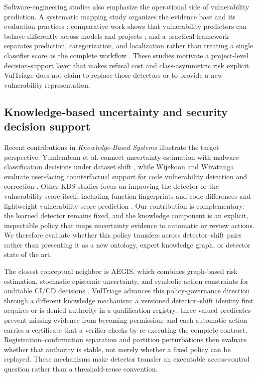 \documentclass[preprint,12pt]{elsarticle}
\newcommand{\method}{VulTriage\xspace}
\begin{document}
Software-engineering studies also emphasize the operational side of vulnerability prediction. A systematic mapping study organizes the evidence base and its evaluation practices \cite{kalouptsoglou2023mapping}; comparative work shows that vulnerability predictors can behave differently across models and projects \cite{theisen2020better}; and a practical framework separates prediction, categorization, and localization rather than treating a single classifier score as the complete workflow \cite{liu2024practical}. These studies motivate a project-level decision-support layer that makes refusal cost and class-asymmetric risk explicit. \method does not claim to replace those detectors or to provide a new vulnerability representation.

\subsection{Knowledge-based uncertainty and security decision support}

Recent contributions in \textit{Knowledge-Based Systems} illustrate the target perspective. Yumlembam et al. connect uncertainty estimation with malware-classification decisions under dataset shift \cite{yumlembam2026kbs}, while Wijekoon and Wiratunga evaluate user-facing counterfactual support for code vulnerability detection and correction \cite{wijekoon2023discern}. Other KBS studies focus on improving the detector or the vulnerability score itself, including function fingerprints and code differences \cite{zhao2023vuldeff} and lightweight vulnerability-score prediction \cite{mirtaheri2025vulscore}. Our contribution is complementary: the learned detector remains fixed, and the knowledge component is an explicit, inspectable policy that maps uncertainty evidence to automatic or review actions. We therefore evaluate whether this policy transfers across detector--shift pairs rather than presenting it as a new ontology, expert knowledge graph, or detector state of the art.

The closest conceptual neighbor is AEGIS, which combines graph-based risk estimation, stochastic epistemic uncertainty, and symbolic action constraints for auditable CI/CD decisions \cite{abdallah2026aegis}. \method advances this policy-governance direction through a different knowledge mechanism: a versioned detector--shift identity first acquires or is denied authority in a qualification registry; three-valued predicates prevent missing evidence from becoming permission; and each automatic action carries a certificate that a verifier checks by re-executing the complete contract. Registration--confirmation separation and partition perturbations then evaluate whether that authority is stable, not merely whether a fixed policy can be replayed. These mechanisms make detector transfer an executable access-control question rather than a threshold-reuse convention.
\end{document}
